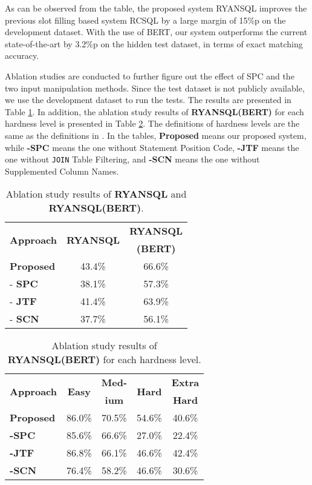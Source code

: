 \documentclass[11pt,a4paper]{article}
\begin{document}
As can be observed from the table, the proposed system RYANSQL improves the previous slot filling based system RCSQL by a large margin of 15\%p on the development dataset. With the use of BERT, our system outperforms the current state-of-the-art by 3.2\%p on the hidden test dataset, in terms of exact matching accuracy.

Ablation studies are conducted to further figure out the effect of SPC and the two input manipulation methods.  Since the test dataset is not publicly available, we use the development dataset to run the tests. The results are presented in Table \ref{tbl:abl}. In addition, the ablation study results of \textbf{RYANSQL(BERT)} for each hardness level is presented in Table \ref{tbl:diff}. The definitions of hardness levels are the same as the definitions in \citet{Yu:18}. In the tables, \textbf{Proposed} means our proposed system, while \textbf{-SPC} means the one without Statement Position Code, \textbf{-JTF} means the one without \texttt{JOIN} Table Filtering, and \textbf{-SCN} means the one without Supplemented Column Names. 

\begin{table}
\centering
\begin{tabular}{|l|c|c|} \hline
\multirow{2}{*}{\textbf{Approach}}&\multirow{2}{*}{\textbf{RYANSQL}}&\textbf{RYANSQL} \\
& & \textbf{(BERT)} \\ \hline
\textbf{Proposed} & 43.4\% & 66.6\% \\
- \textbf{SPC} &  38.1\% & 57.3\% \\
- \textbf{JTF} & 41.4\% & 63.9\% \\
- \textbf{SCN} & 37.7\% & 56.1\% \\ \hline
\end{tabular}
\caption{Ablation study results of \textbf{RYANSQL} and \textbf{RYANSQL(BERT)}.}
\label{tbl:abl}
\end{table}

\begin{table}
\centering
\begin{tabular}{|l|c|c|c|c|} \hline
\multirow{2}{*}{\textbf{Approach}} & \multirow{2}{*}{\textbf{Easy}} & \textbf{Med-} & \multirow{2}{*}{\textbf{Hard}} & \textbf{Extra} \\
&&\textbf{ium}&&\textbf{Hard} \\ \hline
\textbf{Proposed}&86.0\%&70.5\%&54.6\%&40.6\% \\ 
\textbf{-SPC}&85.6\%&66.6\%&27.0\%&22.4\% \\ 
\textbf{-JTF}&86.8\%&66.1\%&46.6\%&42.4\% \\ 
\textbf{-SCN}&76.4\%&58.2\%&46.6\%&30.6\% \\ \hline
\end{tabular}
\caption{Ablation study results of \textbf{RYANSQL(BERT)} for each hardness level.}
\label{tbl:diff}
\end{table}
\end{document}
